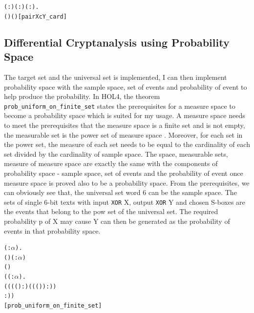 \documentclass{article}
\begin{document}
\begin{alltt}
  \HOLTokenTurnstile{} \HOLSymConst{\HOLTokenForall{}}( :) ( :) ( :).
      (   ) \HOLSymConst{=}  (   )\hfill{[pairXcY_card]}
\end{alltt}

\subsection{Differential Cryptanalysis using Probability Space}
The target set and the universal set is implemented, I can then implement probability space with the sample space,
set of events and probability of event to help produce
the probability. In HOL4, the theorem \verb|prob_uniform_on_finite_set| states the prerequisites for a measure space
to become a probability space which is suited for my usage. A measure space needs to meet the prerequisites that the measure
space is a finite set and is not empty, the measurable set is the
power set of measure space . Moreover, for each set in the power set, the measure of each set needs to be equal to the
cardinality of each set divided by the cardinality of sample space.
The space, measurable sets, measure of measure space are exactly the same with the components of probability
space - sample space, set of events and the probability of event once measure space is proved also to be a probability space.
From the prerequisites, we can obviously see that, the universal set word 6 can be the sample space.
The sets of single 6-bit texts with input \verb|XOR| X, output \verb|XOR| Y and chosen S-boxes are the events that belong to the
pow set of the universal set.
The required probability p of X may cause Y can then be generated as the probability of events in that probability space.

\begin{alltt}
  \HOLTokenTurnstile{} \HOLSymConst{\HOLTokenForall{}}( :\ensuremath{\alpha} ).
      ( ) \HOLSymConst{\HOLTokenConj{}}   \HOLSymConst{\HOLTokenNotEqual{}} (\HOLSymConst{\HOLTokenEmpty{}} :\ensuremath{\alpha} \HOLTokenMap{} ) \HOLSymConst{\HOLTokenConj{}}
       \HOLSymConst{=}  ( ) \HOLSymConst{\HOLTokenConj{}}
     (\HOLSymConst{\HOLTokenForall{}}( :\ensuremath{\alpha} \HOLTokenMap{} ).
         \HOLSymConst{\HOLTokenIn{}}   \HOLSymConst{\HOLTokenImp{}}
           \HOLSymConst{=}
        ((((\HOLSymConst{\&} ) :) \HOLSymConst{/} ((\HOLSymConst{\&} ( )) :))
           :)) \HOLSymConst{\HOLTokenImp{}}
      \hfill{[prob_uniform_on_finite_set]}
\end{alltt}
\end{document}

